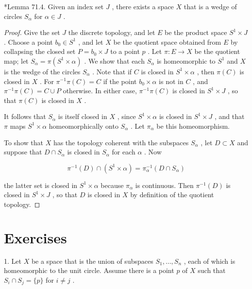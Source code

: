 *Lemma 71.4. Given an index set \(J\) , there exists a space \(X\) that is a wedge of circles \({S}_{\alpha }\) for \(\alpha  \in  J\) .

\begin{proof}Give the set \(J\) the discrete topology, and let \(E\) be the product space \({S}^{1} \times  J\) . Choose a point \({b}_{0} \in  {S}^{1}\) , and let \(X\) be the quotient space obtained from \(E\) by collapsing the closed set \(P = {b}_{0} \times  J\) to a point \(p\) . Let \(\pi  : E \rightarrow  X\) be the quotient map; let \({S}_{\alpha } = \pi \left( {{S}^{1} \times  \alpha }\right)\) . We show that each \({S}_{\alpha }\) is homeomorphic to \({S}^{1}\) and \(X\) is the wedge of the circles \({S}_{\alpha }\) .
Note that if \(C\) is closed in \({S}^{1} \times  \alpha\) , then \(\pi \left( C\right)\) is closed in \(X\) . For \({\pi }^{-1}\pi \left( C\right)  = C\) if the point \({b}_{0} \times  \alpha\) is not in \(C\) , and \({\pi }^{-1}\pi \left( C\right)  = C \cup  P\) otherwise. In either case, \({\pi }^{-1}\pi \left( C\right)\) is closed in \({S}^{1} \times  J\) , so that \(\pi \left( C\right)\) is closed in \(X\) .

It follows that \({S}_{\alpha }\) is itself closed in \(X\) , since \({S}^{1} \times  \alpha\) is closed in \({S}^{1} \times  J\) , and that \(\pi\) maps \({S}^{1} \times  \alpha\) homeomorphically onto \({S}_{\alpha }\) . Let \({\pi }_{\alpha }\) be this homeomorphism.

To show that \(X\) has the topology coherent with the subspaces \({S}_{\alpha }\) , let \(D \subset  X\) and suppose that \(D \cap  {S}_{\alpha }\) is closed in \({S}_{\alpha }\) for each \(\alpha\) . Now

\[
{\pi }^{-1}\left( D\right)  \cap  \left( {{S}^{1} \times  \alpha }\right)  = {\pi }_{\alpha }^{-1}\left( {D \cap  {S}_{\alpha }}\right)
\]

the latter set is closed in \({S}^{1} \times  \alpha\) because \({\pi }_{\alpha }\) is continuous. Then \({\pi }^{-1}\left( D\right)\) is closed in \({S}^{1} \times  J\) , so that \(D\) is closed in \(X\) by definition of the quotient topology.
\end{proof}
\section*{Exercises}

1. Let \(X\) be a space that is the union of subspaces \({S}_{1},\ldots ,{S}_{n}\) , each of which is homeomorphic to the unit circle. Assume there is a point \(p\) of \(X\) such that \({S}_{i} \cap  {S}_{j} = \{ p\}\) for \(i \neq  j\) .

